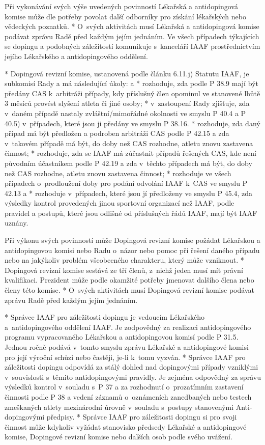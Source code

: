 Při vykonávání svých výše uvedených povinností Lékařská a antidopingová komise může dle potřeby povolat další odborníky pro získání lékařských nebo vědeckých poznatků.
* O~svých aktivitách musí Lékařská a antidopingová komise podávat zprávu Radě před každým jejím jednáním. Ve všech případech týkajících se dopingu a podobných záležitostí komunikuje s~kanceláří IAAF prostřednictvím jejího Lékařského a antidopingového oddělení.

* Dopingová revizní komise, ustanovená podle článku 6.11.j) Statutu IAAF, je subkomisí Rady a má následující úkoly:
  \begitems \style a
  * rozhoduje, zda podle P 38.9 mají být předány CAS k~arbitráži případy, kdy příslušný člen opominul ve stanovené lhůtě 3 měsíců provést slyšení atleta či jiné osoby;
  * v~zastoupení Rady zjišťuje, zda v~daném případě nastaly zvláštní/mimořádné okolnosti ve smyslu P 40.4 a P 40.5) v~případech, které jsou ji předány ve smyslu P 38.16.
  * rozhoduje, zda daný případ má být předložen a podroben arbitráži CAS podle P 42.15 a zda v~takovém případě má být, do doby než CAS rozhodne, atletu znovu zastavena činnost;
  * rozhoduje, zda se IAAF má zúčastnit případů řešených CAS, kde není původním účastníkem podle P 42.19 a zda v~těchto případech má být, do doby než CAS rozhodne, atletu znovu zastavena činnost;
  * rozhoduje ve všech případech o~prodloužení doby pro podání odvolání IAAF k~CAS ve smyslu P 42.13 a
  * rozhoduje v~případech, které jsou jí předloženy ve smyslu P 45.4, zda výsledky kontrol provedených jinou sportovní organizací než IAAF, podle pravidel a postupů, které jsou odlišné od příslušných řádů IAAF, mají být IAAF uznány.
  \enditems

Při výkonu svých povinností může Dopingová revizní komise požádat Lékařskou a antidopingovou komisi nebo Radu o~názor nebo pomoc při řešení daného případu nebo na jakýkoliv problém všeobecného charakteru, který může vzniknout.
* Dopingová revizní komise sestává ze tří členů, z~nichž jeden musí mít právní kvalifikaci. Prezident může podle okamžité potřeby jmenovat dalšího člena nebo členy této komise.
* O~svých aktivitách musí Dopingová revizní komise podávat zprávu Radě před každým jejím jednáním.

* Správce IAAF pro záležitosti dopingu je vedoucím Lékařského a~antidopingového oddělení IAAF. Je zodpovědný za realizaci antidopingového programu vypracovaného Lékařskou a antidopingovou komisí podle P 31.5. Jednou ročně podává v~tomto smyslu zprávu Lékařské a antidopingové komisi pro její výroční schůzi nebo častěji, je-li k~tomu vyzván.
* Správce IAAF pro záležitosti dopingu odpovídá za stálý dohled nad dopingovými případy vzniklými v~souvislosti s~těmito antidopingovými pravidly. Je zejména odpovědný za správu výsledků kontrol v~souladu s~P 37 a za rozhodnutí o~prozatímním zastavení činnosti podle P 38 a vedení záznamů o~oznámeních zanedbaných nebo testech zmeškaných atlety mezinárodní úrovně v~souladu s~postupy stanovenými Anti-dopingovými předpisy.
* Správce IAAF pro záležitosti dopingu si pro svoji činnost může kdykoliv vyžádat stanovisko předsedy Lékařské a antidopingové komise, Dopingové revizní komise nebo dalších osob podle svého uvážení.
\enditems

